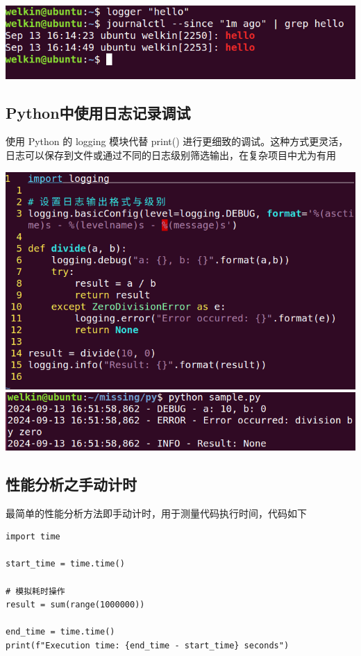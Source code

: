 \documentclass[UTF8,a4paper]{ctexart}
\begin{document}
\begin{sloppypar}
	\includegraphics[width = 16cm]{1}
	
	\subsection{Python中使用日志记录调试}
	使用 Python 的 logging 模块代替 print() 进行更细致的调试。这种方式更灵活，日志可以保存到文件或通过不同的日志级别筛选输出，在复杂项目中尤为有用
	
	\includegraphics[width = 16cm]{21}
	\includegraphics[width = 16cm]{22}
	
	\subsection{性能分析之手动计时}
	最简单的性能分析方法即手动计时，用于测量代码执行时间，代码如下
	\begin{lstlisting}
import time

start_time = time.time()

# 模拟耗时操作
result = sum(range(1000000))

end_time = time.time()
print(f"Execution time: {end_time - start_time} seconds")
	\end{lstlisting}
	

\end{sloppypar}
\end{document}
